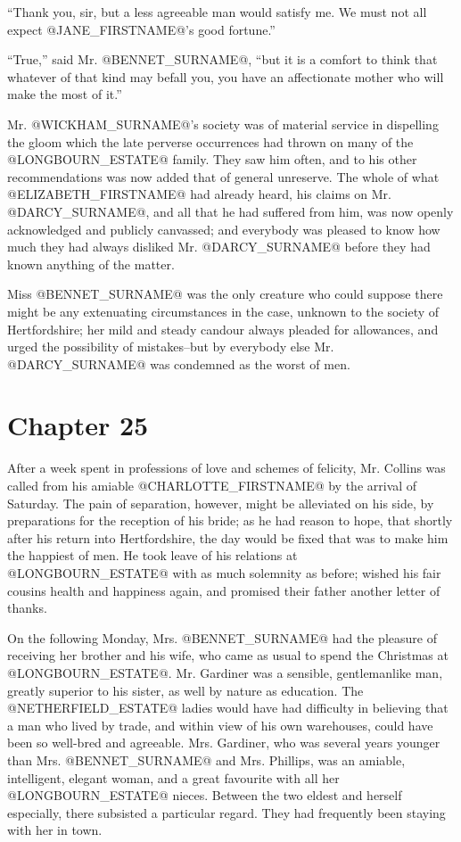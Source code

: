 ``Thank you, sir, but a less agreeable man would satisfy me. We must not
all expect @JANE_FIRSTNAME@'s good fortune.''

``True,'' said Mr. @BENNET_SURNAME@, ``but it is a comfort to think that whatever of
that kind may befall you, you have an affectionate mother who will make
the most of it.''

Mr. @WICKHAM_SURNAME@'s society was of material service in dispelling the gloom
which the late perverse occurrences had thrown on many of the @LONGBOURN_ESTATE@
family. They saw him often, and to his other recommendations was now
added that of general unreserve. The whole of what @ELIZABETH_FIRSTNAME@ had already
heard, his claims on Mr. @DARCY_SURNAME@, and all that he had suffered from him,
was now openly acknowledged and publicly canvassed; and everybody was
pleased to know how much they had always disliked Mr. @DARCY_SURNAME@ before they
had known anything of the matter.

Miss @BENNET_SURNAME@ was the only creature who could suppose there might be
any extenuating circumstances in the case, unknown to the society
of Hertfordshire; her mild and steady candour always pleaded for
allowances, and urged the possibility of mistakes--but by everybody else
Mr. @DARCY_SURNAME@ was condemned as the worst of men.



\chapter*{Chapter 25}


After a week spent in professions of love and schemes of felicity,
Mr. Collins was called from his amiable @CHARLOTTE_FIRSTNAME@ by the arrival of
Saturday. The pain of separation, however, might be alleviated on his
side, by preparations for the reception of his bride; as he had reason
to hope, that shortly after his return into Hertfordshire, the day would
be fixed that was to make him the happiest of men. He took leave of his
relations at @LONGBOURN_ESTATE@ with as much solemnity as before; wished his fair
cousins health and happiness again, and promised their father another
letter of thanks.

On the following Monday, Mrs. @BENNET_SURNAME@ had the pleasure of receiving
her brother and his wife, who came as usual to spend the Christmas
at @LONGBOURN_ESTATE@. Mr. Gardiner was a sensible, gentlemanlike man, greatly
superior to his sister, as well by nature as education. The @NETHERFIELD_ESTATE@
ladies would have had difficulty in believing that a man who lived
by trade, and within view of his own warehouses, could have been so
well-bred and agreeable. Mrs. Gardiner, who was several years younger
than Mrs. @BENNET_SURNAME@ and Mrs. Phillips, was an amiable, intelligent, elegant
woman, and a great favourite with all her @LONGBOURN_ESTATE@ nieces. Between the
two eldest and herself especially, there subsisted a particular regard.
They had frequently been staying with her in town.

